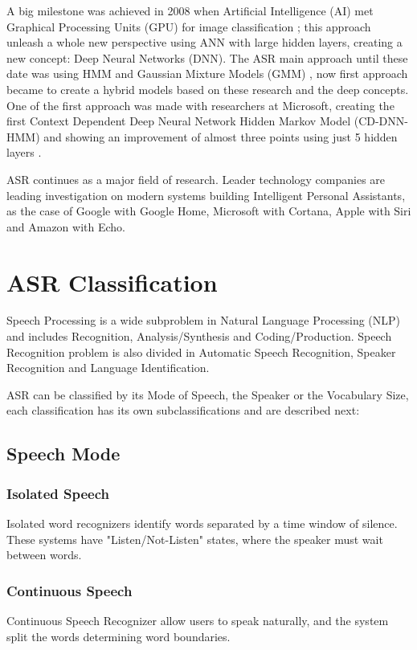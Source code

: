 A big milestone was achieved in 2008 when Artificial Intelligence (AI) met Graphical Processing Units (GPU) for image classification \cite{KrizhevskyImageNetNetworks}; this approach unleash a whole new perspective using ANN with large hidden layers, creating a new concept: Deep Neural Networks (DNN).  The ASR main approach until these date was using HMM and Gaussian Mixture Models (GMM) \cite{XuedongHuangAlexAceroHsiao-WuenHon201,HwangSubphoneticRecognition}, now first approach became to create a hybrid models based on these research and the deep concepts. One of the first approach was made with researchers at Microsoft, creating the first Context Dependent Deep Neural Network Hidden Markov Model (CD-DNN-HMM) and showing an improvement of almost three points using just 5 hidden layers \cite{Xiong2017}. 

ASR continues as a major field of research. Leader technology companies are leading investigation on modern systems building Intelligent Personal Assistants, as the case of Google with Google Home\cite{Li2017}, Microsoft with Cortana\cite{Xiong2017}, Apple with Siri and Amazon with Echo.

\section{ASR Classification}
Speech Processing is a wide subproblem in Natural Language Processing (NLP) and includes Recognition, Analysis/Synthesis and Coding/Production. Speech Recognition problem is also divided in Automatic Speech Recognition, Speaker Recognition and Language Identification.

ASR can be classified by its Mode of Speech, the Speaker or the Vocabulary Size, each classification has its own subclassifications and are described next:
\subsection{Speech Mode}
\subsubsection{Isolated Speech}
Isolated word recognizers identify words separated by a time window of silence. These systems have "Listen/Not-Listen" states, where the speaker must wait between words.
\subsubsection{Continuous Speech}
Continuous Speech Recognizer allow users to speak naturally, and the system split the words determining word boundaries.
